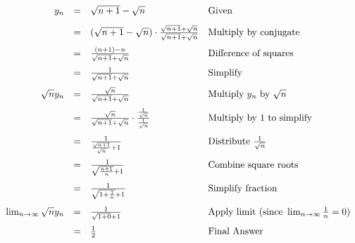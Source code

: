 \documentclass[11pt]{article}
\theoremstyle{plain}
\begin{document}
\[
	\begin{array}{r c l l}
		y_n                             & = & \sqrt{n+1}-\sqrt{n}                                                                      & \text{Given}                                                            \\ [2ex]
		                                & = & (\sqrt{n+1}-\sqrt{n}) \cdot \frac{\sqrt{n+1}+\sqrt{n}}{\sqrt{n+1}+\sqrt{n}}              & \text{Multiply by conjugate}                                            \\ [2ex]
		                                & = & \frac{(n+1)-n}{\sqrt{n+1}+\sqrt{n}}                                                      & \text{Difference of squares}                                            \\ [2ex]
		                                & = & \frac{1}{\sqrt{n+1}+\sqrt{n}}                                                            & \text{Simplify}                                                         \\ [2ex]
		\sqrt{n}y_n                     & = & \frac{\sqrt{n}}{\sqrt{n+1}+\sqrt{n}}                                                     & \text{Multiply } y_n \text{ by } \sqrt{n}                               \\ [2ex]
		                                & = & \frac{\sqrt{n}}{\sqrt{n+1}+\sqrt{n}} \cdot \frac{\frac{1}{\sqrt{n}}}{\frac{1}{\sqrt{n}}} & \text{Multiply by } 1 \text{ to simplify}                               \\ [3ex]
		                                & = & \frac{1}{ \frac{\sqrt{n+1}}{\sqrt{n}} + 1}                                               & \text{Distribute } \frac{1}{\sqrt{n}}                                   \\ [3ex]
		                                & = & \frac{1}{ \sqrt{\frac{n+1}{n}} + 1}                                                      & \text{Combine square roots}                                             \\ [3ex]
		                                & = & \frac{1}{ \sqrt{1 + \frac{1}{n}} + 1}                                                    & \text{Simplify fraction}                                                \\ [3ex]
		\lim_{n \to \infty} \sqrt{n}y_n & = & \frac{1}{ \sqrt{1 + 0} + 1}                                                              & \text{Apply limit (since } \lim_{n \to \infty} \frac{1}{n} = 0 \text{)} \\ [2ex]
		                                & = & \frac{1}{2}                                                                              & \text{Final Answer}                                                     \\
	\end{array}
\]
\end{document}
